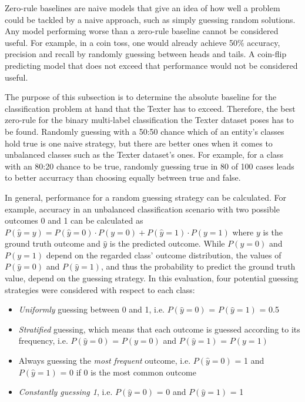 Zero-rule baselines are naive models that give an idea of how well a problem could be tackled by a naive approach, such as simply guessing random solutions. Any model performing worse than a zero-rule baseline cannot be considered useful. For example, in a coin toss, one would already achieve 50\% accuracy, precision and recall by randomly guessing between heads and tails. A coin-flip predicting model that does not exceed that performance would not be considered useful.

The purpose of this subsection is to determine the absolute baseline for the classification problem at hand that the Texter has to exceed. Therefore, the best zero-rule for the binary multi-label classification the Texter dataset poses has to be found. Randomly guessing with a 50:50 chance which of an entity's classes hold true is one naive strategy, but there are better ones when it comes to unbalanced classes such as the Texter dataset's ones. For example, for a class with an 80:20 chance to be true, randomly guessing true in 80 of 100 cases leads to better accurracy than choosing equally between true and false.

In general, performance for a random guessing strategy can be calculated. For example, accuracy in an unbalanced classification scenario with two possible outcomes 0 and 1 can be calculated as $P(\hat{y} = y) = P(\hat{y} = 0) \cdot P(y = 0) + P(\hat{y} = 1) \cdot P(y = 1)$ where $y$ is the ground truth outcome and $\hat{y}$ is the predicted outcome. While $P(y = 0)$ and $P(y = 1)$ depend on the regarded class' outcome distribution, the values of $P(\hat{y} = 0)$ and $P(\hat{y} = 1)$, and thus the probability to predict the ground truth value, depend on the guessing strategy. In this evaluation, four potential guessing strategies were considered with respect to each class:

\begin{itemize}
    \item \emph{Uniformly} guessing between 0 and 1, i.e. $P(\hat{y} = 0)$ = $P(\hat{y} = 1)$ = 0.5

    \item \emph{Stratified} guessing, which means that each outcome is guessed according to its frequency, i.e. $P(\hat{y} = 0)$ = $P(y = 0)$ and $P(\hat{y} = 1)$ = $P(y = 1)$

    \item Always guessing the \emph{most frequent} outcome, i.e.  $P(\hat{y} = 0)$ = 1 and $P(\hat{y} = 1)$ = 0 if 0 is the most common outcome

    \item \emph{Constantly guessing 1}, i.e. $P(\hat{y} = 0)$ = 0 and $P(\hat{y} = 1)$ = 1
\end{itemize}

